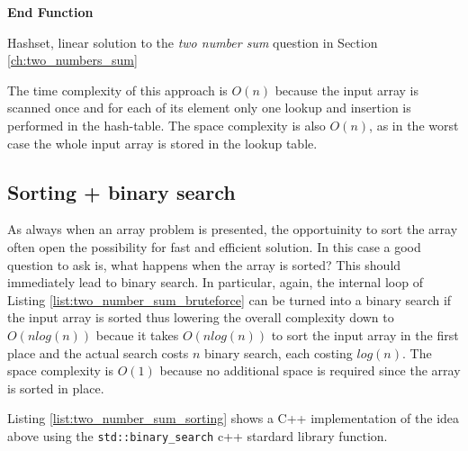 \begin{algorithm}
	
	\textbf{End Function}
	\label{algo:two_numbers_sum_hashset_wrong}
	\caption{Hashset, linear solution to the \textit{two number sum} question in Section \ref{ch:two_numbers_sum} }
\end{algorithm}

The time complexity of this approach is $O(n)$ because the input array is scanned once and for each of its element only one lookup and insertion is performed in the hash-table.  The space complexity is also $O(n)$, as in the worst case the whole input array is stored in the lookup table.

\subsection{Sorting + binary search}
\label{sect:two_number_problem_binary_search}
As always when an array problem is presented, the opportuinity to sort the array often open the possibility for fast and efficient solution. 
In this case a good question to ask is, what happens when the array is sorted? This should immediately lead to binary search. In particular, again, the internal loop of Listing \ref{list:two_number_sum_bruteforce} can be turned into a binary search if the input array is sorted thus lowering the overall complexity down to $O(n log(n))$ becaue it takes $O(n log(n))$ to sort the input array in the first place and the actual search costs $n$ binary search, each costing $log(n)$.
The space complexity is $O(1)$ because no additional space is required since the array is sorted in place. 

Listing \ref{list:two_number_sum_sorting} shows a C++ implementation of the idea above using the \texttt{std::binary\_search} c++ stardard library function.


